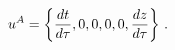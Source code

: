 \begin{equation}\label{u}
u^A = \left\{ {{dt}\over {d\tau}}, 0,0,0,0,{{dz}\over{d\tau}} \right\}
\, .
\end{equation}


